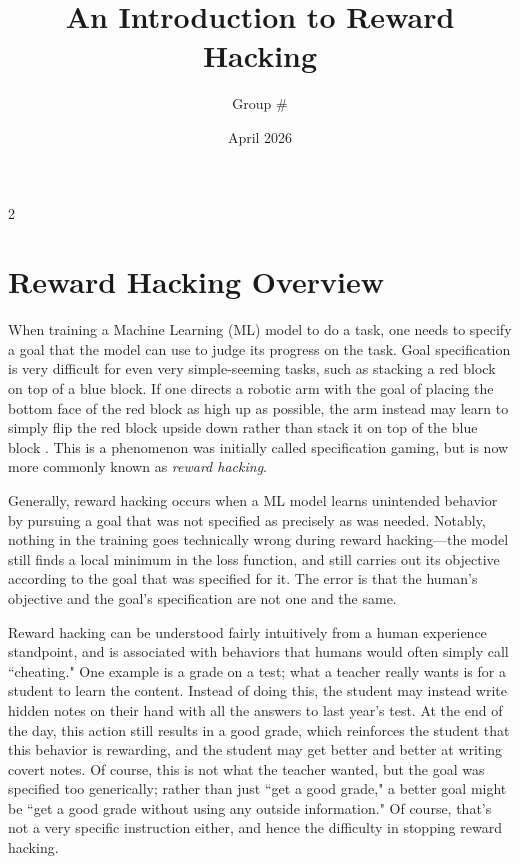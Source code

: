 \documentclass{article}
\title{An Introduction to Reward Hacking}
\author{Group \#}
\date{April 2026}
\begin{document}
\maketitle

\begin{multicols}{2}

\section{Reward Hacking Overview}
When training a Machine Learning (ML) model to do a task, one needs to specify a goal that the model can use to judge its progress on the task. Goal specification is very difficult for even very simple-seeming tasks, such as stacking a red block on top of a blue block. If one directs a robotic arm with the goal of placing the bottom face of the red block as high up as possible, the arm instead may learn to simply flip the red block upside down rather than stack it on top of the blue block \citep{specification-gaming}. This is a phenomenon was initially called specification gaming, but is now more commonly known as \emph{reward hacking}. 

Generally, reward hacking occurs when a ML model learns unintended behavior by pursuing a goal that was not specified as precisely as was needed. Notably, nothing in the training goes technically wrong during reward hacking---the model still finds a local minimum in the loss function, and still carries out its objective according to the goal that was specified for it. The error is that the human's objective and the goal's specification are not one and the same. 

Reward hacking can be understood fairly intuitively from a human experience standpoint, and is associated with behaviors that humans would often simply call ``cheating." One example is a grade on a test; what a teacher really wants is for a student to learn the content. Instead of doing this, the student may instead write hidden  notes on their hand with all the answers to last year's test. At the end of the day, this action still results in a good grade, which reinforces the student that this behavior is rewarding, and the student may get better and better at writing covert notes. Of course, this is not what the teacher wanted, but the goal was specified too generically; rather than just ``get a good grade," a better goal might be ``get a good grade without using any outside information." Of course, that's not a very specific instruction either, and hence the difficulty in stopping reward hacking.


\end{multicols}
\end{document}
